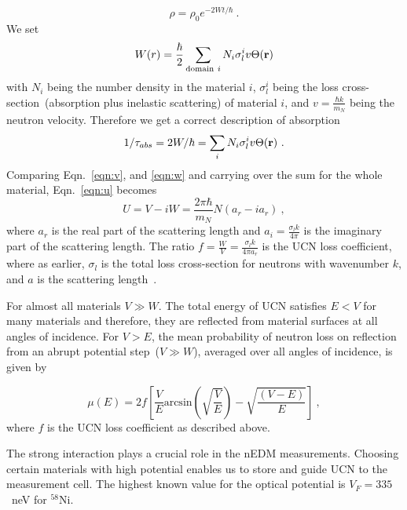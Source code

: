 \begin{equation}
\rho = \rho_0 e^{-2Wt/\hbar}~.
\end{equation}
We set
\begin{equation}
  \label{eqn:w}
W(r) = \frac{\hbar}{2}\sum_{\mathrm{domain}~i}N_i \sigma^i_l v \Theta(\bf{r})
\end{equation}
with $N_i$ being the number density in the material $i$, $\sigma^i_l$ being the loss
cross-section~(absorption plus inelastic scattering) of material $i$,
and $v = \frac{\hbar k}{m_N}$ being the neutron velocity.
Therefore we get a correct description of absorption
\begin{equation}
  1/\tau_{abs} = 2W/\hbar = \sum_i N_i \sigma^i_l v \Theta(\bf{r})~.
\end{equation}
Comparing Eqn.~\ref{eqn:v}, and \ref{eqn:w} and carrying over the sum
for the whole material, Eqn.~\ref{eqn:u} becomes
\begin{equation}
U = V - iW = \frac{2 \pi \hbar}{m_N} N(a_r - i a_r)~,
\end{equation}
where $a_r$ is the real part of the scattering length and
$a_i = \frac{\sigma_l k}{4\pi}$ is the imaginary part of the
scattering length. The ratio
$f = \frac{W}{V} = \frac{\sigma_l k}{4 \pi a_r}$ is the UCN loss
coefficient, where as earlier, $\sigma_l$ is the total loss
cross-section for neutrons with wavenumber $k$, and $a$ is the
scattering length~\cite{ucnbook}.

For almost all materials $V \gg W$. The total energy of UCN satisfies
$E < V$ for many materials and therefore, they are reflected from
material surfaces at all angles of incidence. For $V > E$, the mean
probability of neutron loss on reflection from an abrupt potential
step~($V \gg W$), averaged over all angles of incidence, is given
by~\cite{richardson1991measurement}

\begin{equation}
  \mu(E) = 2f \left[ \frac{V}{E} \mathrm{arcsin} \left( \sqrt{\frac{V}{E}} \right) - \sqrt{\frac{\left( V - E\right)}{E}} \right]~,
\end{equation}
where $f$ is the UCN loss coefficient as described above.


The strong interaction plays a crucial role in the nEDM
measurements. Choosing certain materials with high potential enables
us to store and guide UCN to the measurement cell. The highest known
value for the optical potential is $V_F=335$~neV for $^{58}$Ni.




